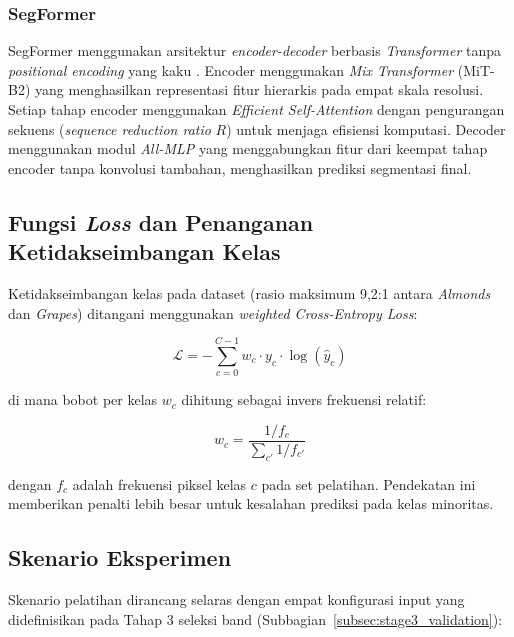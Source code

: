 \subsubsection{SegFormer}

SegFormer menggunakan arsitektur \textit{encoder-decoder} berbasis \textit{Transformer} tanpa \textit{positional encoding} yang kaku \citep{xie2021}. Encoder menggunakan \textit{Mix Transformer} (MiT-B2) yang menghasilkan representasi fitur hierarkis pada empat skala resolusi. Setiap tahap encoder menggunakan \textit{Efficient Self-Attention} dengan pengurangan sekuens (\textit{sequence reduction ratio} $R$) untuk menjaga efisiensi komputasi. Decoder menggunakan modul \textit{All-MLP} yang menggabungkan fitur dari keempat tahap encoder tanpa konvolusi tambahan, menghasilkan prediksi segmentasi final.

\subsection{Fungsi \textit{Loss} dan Penanganan Ketidakseimbangan Kelas}

Ketidakseimbangan kelas pada dataset (rasio maksimum 9,2:1 antara \textit{Almonds} dan \textit{Grapes}) ditangani menggunakan \textit{weighted Cross-Entropy Loss}:

\begin{equation}
    \mathcal{L} = -\sum_{c=0}^{C-1} w_c \cdot y_c \cdot \log(\hat{y}_c)
\end{equation}

di mana bobot per kelas $w_c$ dihitung sebagai invers frekuensi relatif:

\begin{equation}
    w_c = \frac{1 / f_c}{\sum_{c'} 1 / f_{c'}}
\end{equation}

dengan $f_c$ adalah frekuensi piksel kelas $c$ pada set pelatihan. Pendekatan ini memberikan penalti lebih besar untuk kesalahan prediksi pada kelas minoritas.

\subsection{Skenario Eksperimen}

Skenario pelatihan dirancang selaras dengan empat konfigurasi input yang didefinisikan pada Tahap 3 seleksi band (Subbagian~\ref{subsec:stage3_validation}):

